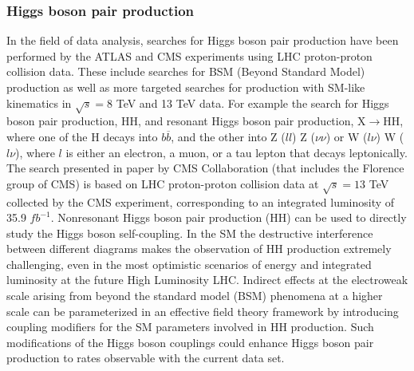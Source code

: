 \documentclass[a4paper,12pt,italian]{article}
\begin{document}
\subsubsection*{Higgs boson pair production}
In the field of data analysis, searches for Higgs boson pair production have been performed by the ATLAS and CMS experiments using LHC proton-proton collision data. These include searches for BSM (Beyond Standard Model) production as well as more targeted searches for production with SM-like kinematics in $\sqrt{s} = 8$ TeV and 13 TeV data. For example the search for Higgs boson pair production, HH, and resonant Higgs boson pair production, $\mathrm{X \rightarrow HH}$, where one of the H decays into $b\overline{b}$, and the other into Z ($ll$) Z ($\nu\nu$) or W ($l\nu$) W ($l\nu$), where $l$ is either an electron, a muon, or a tau lepton that decays leptonically. 
The search presented in paper\cite{Analysis} by CMS Collaboration (that includes the Florence group of CMS) is based on LHC proton-proton collision data at $\sqrt{s}=13$ TeV collected by the CMS experiment, corresponding to an integrated luminosity of 35.9 $fb^{-1}$. 
Nonresonant Higgs boson pair production (HH) can be used to directly study the Higgs boson self-coupling. In the SM the destructive interference between different diagrams makes the observation of HH production extremely challenging, even in the most optimistic scenarios of energy and integrated luminosity at the future High Luminosity LHC. 
Indirect effects at the electroweak scale arising from beyond the standard model (BSM) phenomena at a higher scale can be parameterized in an effective field theory framework by introducing coupling modifiers for the SM parameters involved in HH production. %
 Such modifications of the Higgs boson couplings could enhance Higgs boson pair production to rates observable with the current data set.
\end{document}
